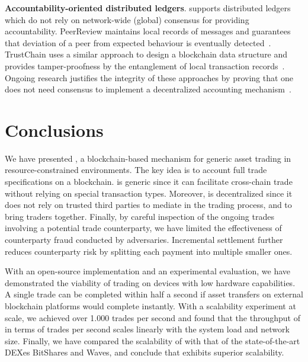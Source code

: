 \textbf{Accountability-oriented distributed ledgers}.
\ModelName{} supports distributed ledgers which do not rely on network-wide (global) consensus for providing accountability.
PeerReview maintains local records of messages and guarantees that deviation of a peer from expected behaviour is eventually detected~\cite{haeberlen2007peerreview}. 
TrustChain uses a similar approach to design a blockchain data structure and provides tamper-proofness by the entanglement of local transaction records~\cite{otte2017trustchain}.
Ongoing research justifies the integrity of these approaches by proving that one does not need consensus to implement a decentralized accounting mechanism~\cite{Guerraoui2019AT2}.

\section{Conclusions}
We have presented \ModelName{}, a blockchain-based mechanism for generic asset trading in resource-constrained environments.
The key idea is to account full trade specifications on a blockchain.
\ModelName{} is generic since it can facilitate cross-chain trade without relying on special transaction types.
Moreover, \ModelName{} is decentralized since it does not rely on trusted third parties to mediate in the trading process, and to bring traders together.
Finally, by careful inspection of the ongoing trades involving a potential trade counterparty, we have limited the effectiveness of counterparty fraud conducted by adversaries.
Incremental settlement further reduces counterparty risk by splitting each payment into multiple smaller ones.

With an open-source implementation and an experimental evaluation, we have demonstrated the viability of trading on devices with low hardware capabilities.
A single trade can be completed within half a second if asset transfers on external blockchain platforms would complete instantly.
With a scalability experiment at scale, we achieved over 1.000 trades per second and found that the throughput of \ModelName{} in terms of trades per second scales linearly with the system load and network size.
Finally, we have compared the scalability of \ModelName{} with that of the state-of-the-art DEXes BitShares and Waves, and conclude that \ModelName{} exhibits superior scalability.


